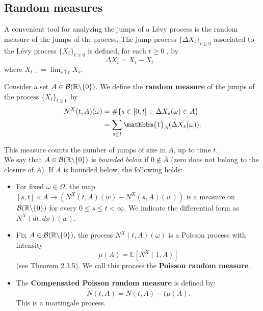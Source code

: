 \subsection{Random measures}\label{random_measures}

A convenient tool for analyzing the jumps of a Lévy process is the random
measure of the jumps of the process.
The jump process $\{\Delta X_t\}_{t \ge 0}$ associated to the Lévy process $\{X_t\}_{t \ge 0}$ is
defined, for each $t \geq 0$ , by
\begin{equation}\label{jump}
 \Delta X_t = X_t - X_{t-}
\end{equation}
where $X_{t-} = \lim_{s\uparrow t} X_s $.\\ 
\begin{Definition}
Consider a set $A \in \mathcal{B}(\mathbb{R} \backslash \{ 0 \})$.
We define the \textbf{random measure} of the jumps of the process $\{X_t\}_{t \ge 0}$ by
\begin{align}
 N^X(t,A)(\omega) &= \# \{ s \in [0,t] \, : \; \Delta X_s(\omega) \in A  \} \\
		   &= \sum_{s\leq t} \mathbbm{1}_A(\Delta X_s(\omega)) . \nonumber
\end{align} 
\end{Definition}
This measure counts the number of jumps of size in $A$, up to time $t$.\\
We say that $A\in \mathcal{B}(\mathbb{R} \backslash \{ 0 \})$ is \emph{bounded below} if $0 \not \in \bar A$ (zero does not belong to the closure of $A$). 
If $A$ is bounded below, the following holds:
\begin{itemize}
 \item For fixed $\omega \in \Omega$, the map $[s,t] \times A \to (N^X(t,A)(w) - N^X(s,A)(w))$ is a measure on 
 $\mathcal{B}(\mathbb{R} \backslash \{ 0 \})$ for every $0 \leq s \leq t < \infty$. We indicate the differential form as $N^X(dt,dx)(w)$.
 \item Fix $A\in \mathcal{B}(\mathbb{R} \backslash \{ 0 \})$, the process $N^X(t,A)(\omega)$ is a Poisson process with intensity 
 \begin{equation}
 \mu(A) = \mathbb{E}[N^X(1,A) ] 
 \end{equation}
 (see \cite{Applebaum} 
 Theorem 2.3.5). We call this process the \textbf{Poisson random measure}.
 \item The \textbf{Compensated Poisson random measure} is defined by:
 \begin{equation}
  \tilde{N}(t,A) = N(t,A) - t\mu(A). 
 \end{equation}
This is a martingale process.
\end{itemize}

